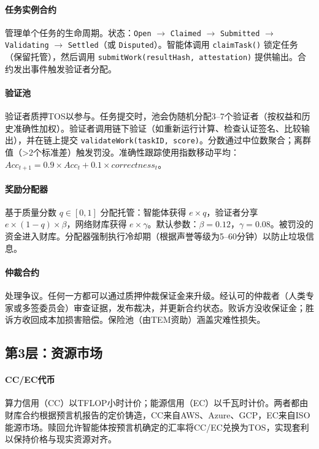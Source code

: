 \documentclass[11pt]{article}
\begin{document}
\paragraph{任务实例合约} 管理单个任务的生命周期。状态：\texttt{Open} $\rightarrow$ \texttt{Claimed} $\rightarrow$ \texttt{Submitted} $\rightarrow$ \texttt{Validating} $\rightarrow$ \texttt{Settled}（或 \texttt{Disputed}）。智能体调用 \texttt{claimTask()} 锁定任务（保留托管），然后调用 \texttt{submitWork(resultHash, attestation)} 提供输出。合约发出事件触发验证者分配。

\paragraph{验证池} 验证者质押TOS以参与。任务提交时，池会伪随机分配3--7个验证者（按权益和历史准确性加权）。验证者调用链下验证（如重新运行计算、检查认证签名、比较输出），并在链上提交 \texttt{validateWork(taskID, score)}。分数通过中位数聚合；离群值（>2个标准差）触发罚没。准确性跟踪使用指数移动平均：$Acc_{t+1} = 0.9 \times Acc_t + 0.1 \times correctness_t$。

\paragraph{奖励分配器} 基于质量分数 $q \in [0,1]$ 分配托管：智能体获得 $e \times q$，验证者分享 $e \times (1-q) \times \beta$，网络财库获得 $e \times \gamma$。默认参数：$\beta=0.12$，$\gamma=0.08$。被罚没的资金进入财库。分配器强制执行冷却期（根据声誉等级为5--60分钟）以防止垃圾信息。

\paragraph{仲裁合约} 处理争议。任何一方都可以通过质押仲裁保证金来升级。经认可的仲裁者（人类专家或多签委员会）审查证据，发布裁决，并更新合约状态。败诉方没收保证金；胜诉方收回成本加损害赔偿。保险池（由TEM资助）涵盖灾难性损失。

\subsection{第3层：资源市场}
\paragraph{CC/EC代币} 算力信用（CC）以TFLOP小时计价；能源信用（EC）以千瓦时计价。两者都由财库合约根据预言机报告的定价铸造，CC来自AWS、Azure、GCP，EC来自ISO能源市场。赎回允许智能体按预言机确定的汇率将CC/EC兑换为TOS，实现套利以保持价格与现实资源对齐。
\end{document}
